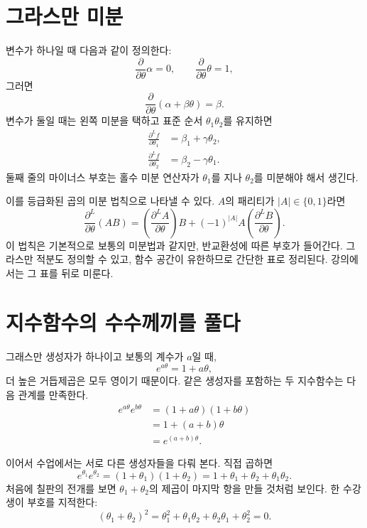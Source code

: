 \section{그라스만 미분}

변수가 하나일 때 다음과 같이 정의한다:
\begin{equation}
\frac{\partial}{\partial\theta}\alpha=0,
\qquad
\frac{\partial}{\partial\theta}\theta=1,
\end{equation}
그러면
\begin{equation}
\frac{\partial}{\partial\theta}
(\alpha+\beta\theta)=\beta.
\end{equation}
변수가 둘일 때는 왼쪽 미분을 택하고 표준 순서 \(\theta_1\theta_2\)를 유지하면
\begin{align}
\frac{\partial^L f}{\partial\theta_1}
&=\beta_1+\gamma\theta_2,\\
\frac{\partial^L f}{\partial\theta_2}
&=\beta_2-\gamma\theta_1.
\end{align}
둘째 줄의 마이너스 부호는 홀수 미분 연산자가 \(\theta_1\)를 지나 \(\theta_2\)를 미분해야 해서 생긴다.

이를 등급화된 곱의 미분 법칙으로 나타낼 수 있다. \(A\)의 패리티가 \(|A|\in\{0,1\}\)라면
\begin{equation}
\frac{\partial^L}{\partial\theta}(AB)
=\left(\frac{\partial^L A}{\partial\theta}\right)B
+(-1)^{|A|}A
\left(\frac{\partial^L B}{\partial\theta}\right).
\end{equation}
이 법칙은 기본적으로 보통의 미분법과 같지만, 반교환성에 따른 부호가 들어간다. 그라스만 적분도 정의할 수 있고, 함수 공간이 유한하므로 간단한 표로 정리된다. 강의에서는 그 표를 뒤로 미룬다.

\section{지수함수의 수수께끼를 풀다}

그래스만 생성자가 하나이고 보통의 계수가 \(a\)일 때,
\begin{equation}
e^{a\theta}
=1+a\theta,
\end{equation}
더 높은 거듭제곱은 모두 영이기 때문이다. 같은 생성자를 포함하는 두 지수함수는 다음 관계를 만족한다.
\begin{align}
e^{a\theta}e^{b\theta}
&=(1+a\theta)(1+b\theta)\\
&=1+(a+b)\theta\\
&=e^{(a+b)\theta}.
\end{align}

이어서 수업에서는 서로 다른 생성자들을 다뤄 본다. 직접 곱하면
\begin{equation}
e^{\theta_1}e^{\theta_2}
=(1+\theta_1)(1+\theta_2)
=1+\theta_1+\theta_2+\theta_1\theta_2.
\end{equation}
처음에 칠판의 전개를 보면 \(\theta_1+\theta_2\)의 제곱이 마지막 항을 만들 것처럼 보인다. 한 수강생이 부호를 지적한다:
\begin{equation}
(\theta_1+\theta_2)^2
=\theta_1^2+\theta_1\theta_2
 +\theta_2\theta_1+\theta_2^2
=0.
\end{equation}

